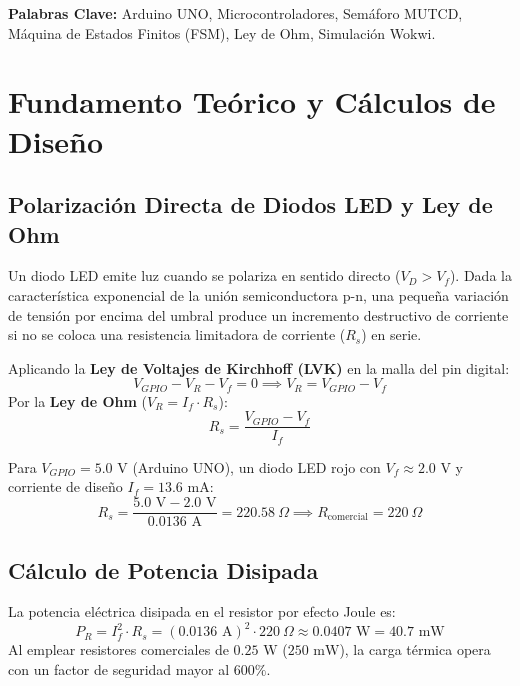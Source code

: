 \documentclass[11pt,a4paper]{article}
\begin{document}
\noindent\textbf{Palabras Clave:} Arduino UNO, Microcontroladores, Semáforo MUTCD, Máquina de Estados Finitos (FSM), Ley de Ohm, Simulación Wokwi.

\section{Fundamento Teórico y Cálculos de Diseño}

\subsection{Polarización Directa de Diodos LED y Ley de Ohm}
Un diodo LED emite luz cuando se polariza en sentido directo ($V_D > V_f$). Dada la característica exponencial de la unión semiconductora p-n, una pequeña variación de tensión por encima del umbral produce un incremento destructivo de corriente si no se coloca una resistencia limitadora de corriente ($R_s$) en serie.

Aplicando la \textbf{Ley de Voltajes de Kirchhoff (LVK)} en la malla del pin digital:
\begin{equation}
    V_{GPIO} - V_{R} - V_f = 0 \implies V_R = V_{GPIO} - V_f
\end{equation}
Por la \textbf{Ley de Ohm} ($V_R = I_f \cdot R_s$):
\begin{equation}
    R_s = \frac{V_{GPIO} - V_f}{I_f}
\end{equation}

\noindent Para $V_{GPIO} = 5.0\text{ V}$ (Arduino UNO), un diodo LED rojo con $V_f \approx 2.0\text{ V}$ y corriente de diseño $I_f = 13.6\text{ mA}$:
\begin{equation}
    R_s = \frac{5.0\text{ V} - 2.0\text{ V}}{0.0136\text{ A}} = 220.58\ \Omega \implies R_{\text{comercial}} = 220\ \Omega
\end{equation}

\subsection{Cálculo de Potencia Disipada}
La potencia eléctrica disipada en el resistor por efecto Joule es:
\begin{equation}
    P_R = I_f^2 \cdot R_s = (0.0136\text{ A})^2 \cdot 220\ \Omega \approx 0.0407\text{ W} = 40.7\text{ mW}
\end{equation}
Al emplear resistores comerciales de $0.25\text{ W}$ ($250\text{ mW}$), la carga térmica opera con un factor de seguridad mayor al $600\%$.
\end{document}
